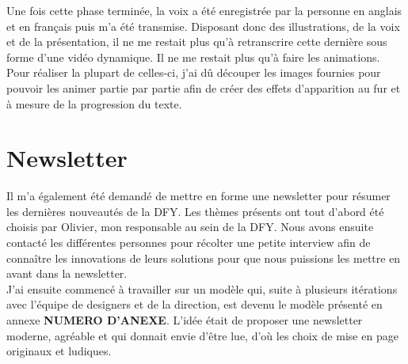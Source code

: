 Une fois cette phase terminée, la voix a été enregistrée par la personne en anglais et en français puis m'a été transmise. Disposant donc des illustrations, de la voix et de la présentation, il ne me restait plus qu'à retranscrire cette dernière sous forme d'une vidéo dynamique. Il ne me restait plus qu'à faire les animations. Pour réaliser la plupart de  celles-ci, j'ai dû découper les images fournies pour pouvoir les animer partie par partie afin de créer des effets d'apparition au fur et à mesure de la progression du texte. 


\section{Newsletter}

Il m'a également été demandé de mettre en forme une newsletter pour résumer les dernières nouveautés de la DFY. Les thèmes présents ont tout d'abord été choisis par Olivier, mon responsable au sein de la DFY. Nous avons ensuite contacté les différentes personnes pour récolter une petite interview afin de connaître les innovations de leurs solutions pour que nous puissions les mettre en avant dans la newsletter.\\

J'ai ensuite commencé à travailler sur un modèle qui, suite à plusieurs itérations avec
l’équipe de designers et de la direction, est devenu le modèle présenté en annexe \textbf{NUMERO D'ANEXE}. L'idée était de proposer une newsletter moderne, agréable et qui donnait envie d'être lue, d'où les choix de mise en page originaux et ludiques.



